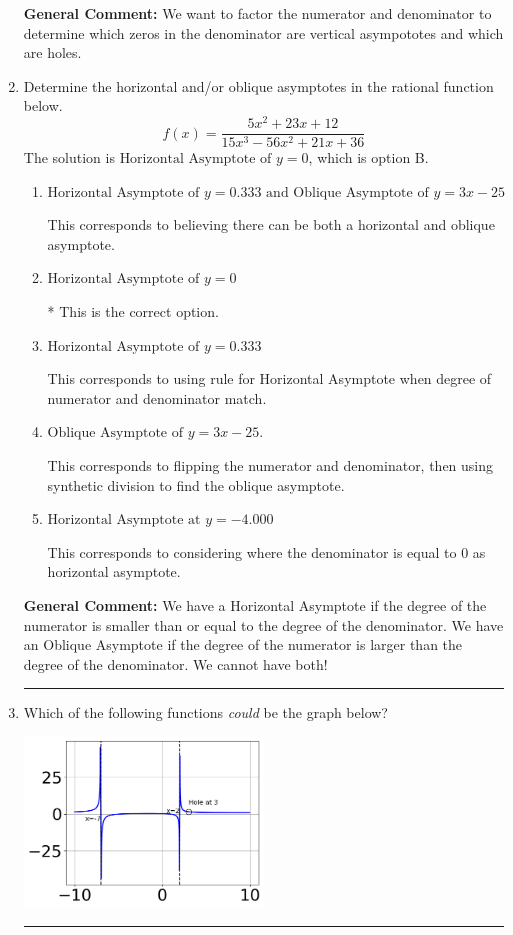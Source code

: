 \documentclass{extbook}[14pt]
\newcommand{\litem}[1]{\item #1

\rule{\textwidth}{0.4pt}}
\begin{document}
\begin{enumerate}
{\textbf{General Comment:} We want to factor the numerator and denominator to determine which zeros in the denominator are vertical asympototes and which are holes.
}
\litem{
Determine the horizontal and/or oblique asymptotes in the rational function below.
\[ f(x) = \frac{5x^{2} +23 x + 12}{15x^{3} -56 x^{2} +21 x + 36} \]The solution is \( \text{Horizontal Asymptote of } y = 0 \), which is option B.\begin{enumerate}[label=\Alph*.]
\item \( \text{Horizontal Asymptote of } y = 0.333 \text{ and Oblique Asymptote of } y = 3x -25 \)

This corresponds to believing there can be both a horizontal and oblique asymptote.
\item \( \text{Horizontal Asymptote of } y = 0 \)

* This is the correct option.
\item \( \text{Horizontal Asymptote of } y = 0.333  \)

This corresponds to using rule for Horizontal Asymptote when degree of numerator and denominator match.
\item \( \text{Oblique Asymptote of } y = 3x -25. \)

This corresponds to flipping the numerator and denominator, then using synthetic division to find the oblique asymptote.
\item \( \text{Horizontal Asymptote at } y = -4.000 \)

This corresponds to considering where the denominator is equal to 0 as horizontal asymptote.
\end{enumerate}

\textbf{General Comment:} We have a Horizontal Asymptote if the degree of the numerator is smaller than or equal to the degree of the denominator. We have an Oblique Asymptote if the degree of the numerator is larger than the degree of the denominator. We cannot have both!
}
\litem{
Which of the following functions \textit{could} be the graph below?

\begin{center}
    \includegraphics[width=0.5\textwidth]{../Figures/identifyGraphOfRationalFunctionB.png}
\end{center}


}
\end{enumerate}
\end{document}
